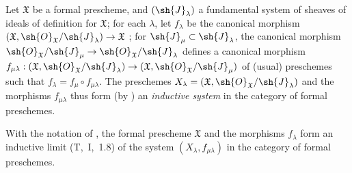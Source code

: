 \begin{env}[10.6.1]
\label{I.10.6.1}
Let $\mathfrak{X}$ be a formal prescheme, and $(\sh{J}_\lambda)$ a fundamental system of sheaves of ideals of definition for $\mathfrak{X}$; for each $\lambda$, let $f_\lambda$ be the canonical morphism $(\mathfrak{X},\sh{O}_\mathfrak{X}/\sh{J}_\lambda)\to\mathfrak{X}$ ; for $\sh{J}_\mu\subset\sh{J}_\lambda$, the canonical morphism $\sh{O}_\mathfrak{X}/\sh{J}_\mu\to\sh{O}_\mathfrak{X}/\sh{J}_\lambda$ defines a canonical morphism
$f_{\mu\lambda}:(\mathfrak{X},\sh{O}_\mathfrak{X}/\sh{J}_\lambda)\to(\mathfrak{X},\sh{O}_\mathfrak{X}/\sh{J}_\mu)$ of (usual) preschemes such that $f_\lambda=f_\mu\circ f_{\mu\lambda}$.
The preschemes $X_\lambda=(\mathfrak{X},\sh{O}_\mathfrak{X}/\sh{J}_\lambda)$ and the morphisms $f_{\mu\lambda}$ thus form (by ) an \emph{inductive system} in the category of formal preschemes.
\end{env}

\begin{proposition}[10.6.2]
\label{I.10.6.2}
With the notation of , the formal prescheme $\mathfrak{X}$ and the morphisms $f_\lambda$ form an inductive limit (T,~I,~1.8) of the system $(X_\lambda,f_{\mu\lambda})$ in the category of formal preschemes.
\end{proposition}

